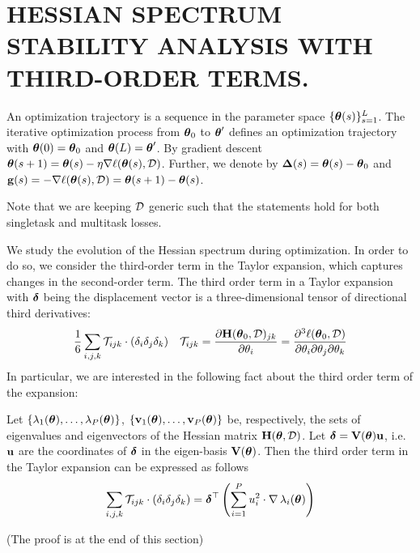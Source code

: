 \documentclass{article} %
\newcommand{\hessian}{\vH}
\begin{document}
\newpage

\section{HESSIAN SPECTRUM STABILITY ANALYSIS WITH THIRD-ORDER TERMS.}
\label{subsec:hessian-spectral-stability}


\begin{defn}
\label{def:opt-traj}
An optimization trajectory is a sequence in the parameter space $\{\mbox{$\mbox{$\boldsymbol{\theta}$}$}(s)\}_{s=1}^{L}$. 
    The iterative optimization process from $\mbox{$\mbox{$\boldsymbol{\theta}$}$}_0$ to $\mbox{$\mbox{$\boldsymbol{\theta}$}$}'$ defines an optimization trajectory with $\mbox{$\mbox{$\boldsymbol{\theta}$}$}(0) = \mbox{$\mbox{$\boldsymbol{\theta}$}$}_0$  and $\mbox{$\mbox{$\boldsymbol{\theta}$}$}(L) = \mbox{$\mbox{$\boldsymbol{\theta}$}$}'$.  By gradient descent $\mbox{$\mbox{$\boldsymbol{\theta}$}$}(s+1) = \mbox{$\mbox{$\boldsymbol{\theta}$}$}(s) - \eta\nabla{\ell({\mbox{$\mbox{$\boldsymbol{\theta}$}$}(s), \mbox{${\cal D}$}})}$. Further, we denote by $\mbox{$\mbox{$\boldsymbol{\Delta}$}$}(s) = \mbox{$\mbox{$\boldsymbol{\theta}$}$}(s) - \mbox{$\mbox{$\boldsymbol{\theta}$}$}_0$ and $\mbox{$\mbox{$\mathbf{g}$}$}(s) = - \nabla{\ell({\mbox{$\mbox{$\boldsymbol{\theta}$}$}(s), \mbox{${\cal D}$}})} = \mbox{$\mbox{$\boldsymbol{\theta}$}$}(s+1) - \mbox{$\mbox{$\boldsymbol{\theta}$}$}(s)$.
\end{defn}

Note that we are keeping $\mbox{${\cal D}$}$ generic such that the statements hold for both singletask and multitask losses. 

We study the evolution of the Hessian spectrum during optimization. In order to do so, we consider the third-order term in the Taylor expansion, which captures changes in the second-order term.  The third order term in a Taylor expansion with $\mbox{$\mbox{$\boldsymbol{\delta}$}$}$ being the displacement vector is a three-dimensional tensor of directional third derivatives:
\begin{align}
    &\frac{1}{6}\sum_{i,j,k}\mathcal{T}_{ijk}\cdot (\delta_i\delta_j\delta_k) & \mathcal{T}_{ijk} = \deriv{\hessian(\vparam_0, \data)_{jk}}{\param_i} = \frac{\partial^3\loss(\vparam_0, \data)}{\partial\param_i \partial\param_j\partial\param_k}
\end{align}
In particular, we are interested in the following fact about the third order term of the expansion: 
\begin{lemma}
\label{lemma:third-order-spectrum}
Let $\{\lambda_1(\mbox{$\mbox{$\boldsymbol{\theta}$}$}), \dots, \lambda_P(\mbox{$\mbox{$\boldsymbol{\theta}$}$})\}$, $\{\mbox{$\mbox{$\mathbf{v}$}$}_1(\mbox{$\mbox{$\boldsymbol{\theta}$}$}), \dots, \mbox{$\mbox{$\mathbf{v}$}$}_P(\mbox{$\mbox{$\boldsymbol{\theta}$}$})\}$ be, respectively, the sets of eigenvalues and eigenvectors of the Hessian matrix $\hessian(\vparam,\data)$. Let $\mbox{$\mbox{$\boldsymbol{\delta}$}$} = \mbox{$\mbox{$\mathbf{V}$}$}(\mbox{$\mbox{$\boldsymbol{\theta}$}$}) \mbox{$\mbox{$\mathbf{u}$}$}$, i.e. $\mbox{$\mbox{$\mathbf{u}$}$}$ are the coordinates of $\mbox{$\mbox{$\boldsymbol{\delta}$}$}$ in the eigen-basis $\mbox{$\mbox{$\mathbf{V}$}$}(\mbox{$\mbox{$\boldsymbol{\theta}$}$})$. Then the third order term in the Taylor expansion can be expressed as follows
\begin{equation}
    \label{eq:third-order-term-formula}
    \sum_{i,j,k}\mathcal{T}_{ijk}\cdot (\delta_i\delta_j\delta_k) = \mbox{$\mbox{$\boldsymbol{\delta}$}$}^\top \left(\sum_{i=1}^P u_i^2 \cdot \nabla\,\lambda_i(\mbox{$\mbox{$\boldsymbol{\theta}$}$})\right)
\end{equation}
\end{lemma}
(The proof is at the end of this section)
\end{document}

